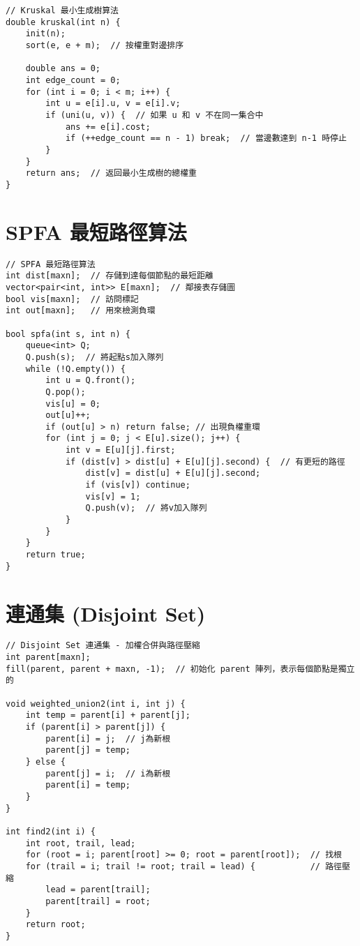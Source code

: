 \documentclass{article}
\begin{document}
\begin{multicols}{2}
\begin{lstlisting}
// Kruskal 最小生成樹算法
double kruskal(int n) {
    init(n);
    sort(e, e + m);  // 按權重對邊排序

    double ans = 0;
    int edge_count = 0;
    for (int i = 0; i < m; i++) {
        int u = e[i].u, v = e[i].v;
        if (uni(u, v)) {  // 如果 u 和 v 不在同一集合中
            ans += e[i].cost;
            if (++edge_count == n - 1) break;  // 當邊數達到 n-1 時停止
        }
    }
    return ans;  // 返回最小生成樹的總權重
}

\end{lstlisting}

\section{SPFA 最短路徑算法}

\begin{lstlisting}
// SPFA 最短路徑算法
int dist[maxn];  // 存儲到達每個節點的最短距離
vector<pair<int, int>> E[maxn];  // 鄰接表存儲圖
bool vis[maxn];  // 訪問標記
int out[maxn];   // 用來檢測負環

bool spfa(int s, int n) {
    queue<int> Q;
    Q.push(s);  // 將起點s加入隊列
    while (!Q.empty()) {
        int u = Q.front();
        Q.pop();
        vis[u] = 0;
        out[u]++;
        if (out[u] > n) return false; // 出現負權重環
        for (int j = 0; j < E[u].size(); j++) {
            int v = E[u][j].first;
            if (dist[v] > dist[u] + E[u][j].second) {  // 有更短的路徑
                dist[v] = dist[u] + E[u][j].second;
                if (vis[v]) continue;
                vis[v] = 1;
                Q.push(v);  // 將v加入隊列
            }
        }
    }
    return true;
}
\end{lstlisting}

\section{連通集 (Disjoint Set)}

\begin{lstlisting}
// Disjoint Set 連通集 - 加權合併與路徑壓縮
int parent[maxn];
fill(parent, parent + maxn, -1);  // 初始化 parent 陣列，表示每個節點是獨立的

void weighted_union2(int i, int j) {
    int temp = parent[i] + parent[j];
    if (parent[i] > parent[j]) {
        parent[i] = j;  // j為新根
        parent[j] = temp;
    } else {
        parent[j] = i;  // i為新根
        parent[i] = temp;
    }
}

int find2(int i) {
    int root, trail, lead;
    for (root = i; parent[root] >= 0; root = parent[root]);  // 找根
    for (trail = i; trail != root; trail = lead) {           // 路徑壓縮
        lead = parent[trail];
        parent[trail] = root;
    }
    return root;
}
\end{lstlisting}


\end{multicols}
\end{document}
